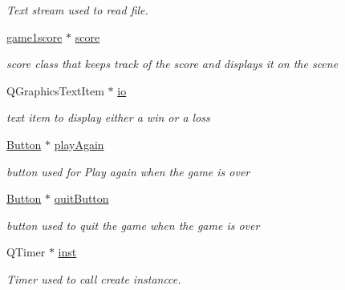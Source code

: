 \begin{DoxyCompactItemize}
\begin{DoxyCompactList}\small\item\em Text stream used to read file. \end{DoxyCompactList}\item 
\mbox{\label{classgame1scene_ae3928d49f36c06f044d7394ae2254b16}} 
\hyperlink{classgame1score}{game1score} $\ast$ \hyperlink{classgame1scene_ae3928d49f36c06f044d7394ae2254b16}{score}
\begin{DoxyCompactList}\small\item\em score class that keeps track of the score and displays it on the scene \end{DoxyCompactList}\item 
\mbox{\label{classgame1scene_aceb64fd219582d9c9cfc5395155b10a5}} 
Q\+Graphics\+Text\+Item $\ast$ \hyperlink{classgame1scene_aceb64fd219582d9c9cfc5395155b10a5}{io}
\begin{DoxyCompactList}\small\item\em text item to display either a win or a loss \end{DoxyCompactList}\item 
\mbox{\label{classgame1scene_a35f11a42c2b6782add5943dc0b471570}} 
\hyperlink{classButton}{Button} $\ast$ \hyperlink{classgame1scene_a35f11a42c2b6782add5943dc0b471570}{play\+Again}
\begin{DoxyCompactList}\small\item\em button used for Play again when the game is over \end{DoxyCompactList}\item 
\mbox{\label{classgame1scene_a41f520712ca895f2902b17d1f1667a07}} 
\hyperlink{classButton}{Button} $\ast$ \hyperlink{classgame1scene_a41f520712ca895f2902b17d1f1667a07}{quit\+Button}
\begin{DoxyCompactList}\small\item\em button used to quit the game when the game is over \end{DoxyCompactList}\item 
\mbox{\label{classgame1scene_a5b2c75e8d9f7e2ba76089735281d432b}} 
Q\+Timer $\ast$ \hyperlink{classgame1scene_a5b2c75e8d9f7e2ba76089735281d432b}{inst}
\begin{DoxyCompactList}\small\item\em Timer used to call create instancce. \end{DoxyCompactList}\item 

\end{DoxyCompactItemize}
